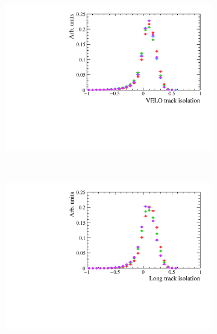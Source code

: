 \begin{figure}
 \begin{subfigure}[b]{0.48\textwidth}
        \includegraphics[width=\textwidth]{./Figs/Selection/signal_iso_velo.pdf}
    \end{subfigure}
    ~ %
    \begin{subfigure}[b]{0.48\textwidth}
       \includegraphics[width=\textwidth]{./Figs/Selection/signal_long_iso.pdf}
    \end{subfigure}





\end{figure}
